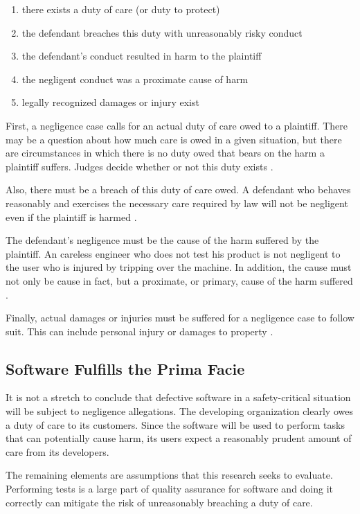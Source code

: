 \singlespace
\begin{enumerate}
 \item there exists a duty of care (or duty to protect)
 \item the defendant breaches this duty with unreasonably risky conduct
 \item the defendant's conduct resulted in harm to the plaintiff
 \item the negligent conduct was a proximate cause of harm
 \item legally recognized damages or injury exist
\end{enumerate}
\doublespace

First, a negligence case calls for an actual duty of care owed to a plaintiff.
There may be a question about how much care is owed in a given situation, but
there are circumstances in which there is no duty owed that bears on the harm a
plaintiff suffers. Judges decide whether or not this duty exists \cite{Dobbs01}.

Also, there must be a breach of this duty of care owed. A defendant who behaves
reasonably and exercises the necessary care required by law will not be
negligent even if the plaintiff is harmed \cite{Dobbs01}.

The defendant's negligence must be the cause of the harm suffered by the
plaintiff. An careless engineer who does not test his product is not negligent
to the user who is injured by tripping over the machine. In addition, the cause
must not only be cause in fact, but a proximate, or primary, cause of the harm
suffered \cite{Dobbs01}.

Finally, actual damages or injuries must be suffered for a negligence case to
follow suit. This can include personal injury or damages to property
\cite{Dobbs01}.

\subsection{Software Fulfills the Prima Facie}

It is not a stretch to conclude that defective software in a safety-critical
situation will be subject to negligence allegations. The developing
organization clearly owes a duty of care to its customers. Since the software
will be used to perform tasks that can potentially cause harm, its users expect
a reasonably prudent amount of care from its developers.

The remaining elements are assumptions that this research seeks to evaluate.
Performing tests is a large part of quality assurance for software and doing it
correctly can mitigate the risk of unreasonably breaching a duty of care.

